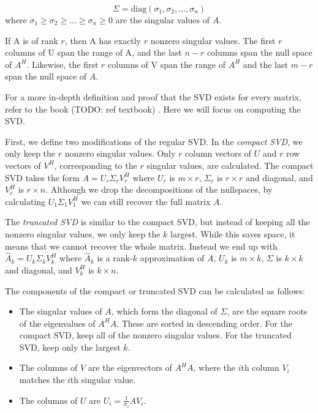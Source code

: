 \begin{equation*}
\Sigma = \mbox{diag}(\sigma_1,\sigma_2,\ldots,\sigma_n)
\end{equation*}
where $\sigma_1 \geq \sigma_2 \geq \ldots \geq \sigma_n \geq 0$ are the singular values of $A$.

If A is of rank $r$, then A has exactly $r$ nonzero singular values.
The first $r$ columns of U span the range of A, and the last $n -r$ columns span the null space of $A^H$.
Likewise, the first $r$ columns of V span the range of $A^H$ and the last $m - r$ span the null space of $A$.

For a more in-depth definition and proof that the SVD exists for every matrix, refer to the book (TODO: ref textbook) .
Here we will focus on computing the SVD. 

First, we define two modifications of the regular SVD.
In the \emph{compact SVD}, we only keep the $r$ nonzero singular values.
Only $r$ column vectors of $U$ and $r$ row vectors of $V^H$, corresponding to the $r$ singular values, are calculated.
The compact SVD takes the form $A= U_r \Sigma_r V_r^H$ where $U_r$ is $m\times r$, $\Sigma_r$ is $r\times r$ and diagonal, and $V_r^H$ is $r\times n$.
Although we drop the decompositions of the nullspaces, by calculating $U_1 \Sigma_1 V_1^H$ we can still recover the full matrix $A$.

The \emph{truncated SVD} is similar to the compact SVD, but instead of keeping all the nonzero singular values, we only keep the $k$ largest.
While this saves space, it means that we cannot recover the whole matrix.
Instead we end up with $\widehat A_k = U_k\Sigma_k V_k^H$ where $\widehat A_k$ is a rank-$k$ approximation of $A$, $U_k$ is $m\times k$, $\Sigma$ is $k \times k$ and diagonal, and $V_k^H$ is $k \times n$.

The components of the compact or truncated SVD can be calculated as follows:
\begin{itemize}
\item The singular values of $A$, which form the diagonal of $\Sigma$, are the square roots of the eigenvalues of $A^HA$. 
These are sorted in descending order. 
For the compact SVD, keep all of the nonzero singular values. 
For the truncated SVD, keep only the largest $k$.
\item The columns of $V$ are the eigenvectors of $A^HA$, where the $i$th column $V_i$ matches the $i$th singular value.
\item The columns of $U$ are $U_i = \frac{1}{\sigma_i} AV_i$.
\end{itemize}

